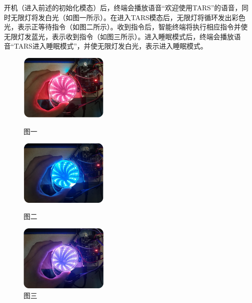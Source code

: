     \hspace{1.5em}开机（进入前述的初始化模态）后，终端会播放语音“欢迎使用TARS”的语音，同时无限灯将发白光（如图一所示）。在进入TARS模态后，无限灯将循环发出彩色光，表示正等待指令（如图二所示）。收到指令后，智能终端将执行相应指令并使无限灯发蓝光，表示收到指令（如图三所示）。进入睡眠模式后，终端会播放语音“TARS进入睡眠模式”，并使无限灯发白光，表示进入睡眠模式。
    \begin{figure}[H]
        \begin{minipage}[htbp]{0.3\linewidth}
        \centering
        \includegraphics[width=1.7in]{./img/Light1.png}
        \caption{图一}
        \end{minipage}%
        \begin{minipage}[htbp]{0.3\linewidth}
            \centering
            \includegraphics[width=1.7in]{./img/Light2.png}
            \caption{图二}
        \end{minipage}%
        \begin{minipage}[htbp]{0.3\linewidth}
            \centering
            \includegraphics[width=1.7in]{./img/Light3.png}
            \caption{图三}
        \end{minipage}%
    \end{figure}
